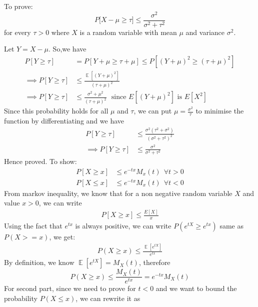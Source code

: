 \begin{solution}
	To prove:
	\begin{equation}
		P\big[X- \mu \geq \tau \big] \leq \frac{\sigma^2}{\sigma^2+\tau^2}
	\end{equation}
	for every $\tau >0$ where $X$ is a random variable with mean $\mu$ and variance $\sigma^2$. \\
	\par Let $Y=X-\mu$. So,we have
	\begin{align}
		P[Y\geq \tau]          & =P[Y+\mu \geq \tau+\mu] \leq P[(Y+\mu)^2\geq (\tau+\mu)^2]                              \\
		\implies P[Y\geq \tau] & \leq \frac{\mathop{\mathbb{E}}[(Y+\mu)^2]}{(\tau+\mu)^2}                                \\
		\implies P[Y\geq \tau] & \leq \frac{\sigma^2+\mu^2}{(\tau+\mu)^2} \:\:\: \text{since $E[(Y+\mu)^2]$ is $E[X^2]$}
	\end{align}
	Since this probability holds for all $\mu$ and $\tau$, we can put $\mu=\frac{\sigma^2}{\tau}$ to minimise the function by differentiating and we have
	\begin{align}
		P[Y\geq \tau]          & \leq \frac{\sigma^{2}(\tau^2+\sigma^2)}{(\sigma^2+\tau^2)^2} \\
		\implies P[Y\geq \tau] & \leq \frac{\sigma^{2}}{\sigma^2+\tau^2}
	\end{align}
	Hence proved.
	To show:
	\begin{align}
		P[X\geq x] & \leq e^{-tx}M_{x}(t) \:\:\forall t>0 \\
		P[X\leq x] & \leq e^{-tx}M_{x}(t) \:\:\forall t<0
	\end{align}
	From markov inequality, we know that for a non negative random variable $X$ and value $x>0$, we can write
	\begin{align}
		P[X\geq x]\leq \frac{E[X]}{x}
	\end{align}
	Using the fact that $e^{tx}$ is always positive, we can write $P(e^{tX}\geq e^{tx})$ same as $P(X>=x)$, we get:
	\begin{align}
		P(X\geq x)\leq \frac{\mathop{\mathbb{E}}[e^{tX}]}{e^{tx}}
	\end{align}
	By definition, we know $\mathop{\mathbb{E}}[e^{tX}]=M_{X}(t)$, therefore
	\begin{equation}
		P(X\geq x)\leq \frac{M_{X}(t)}{e^{tx}}=e^{-tx}M_{X}(t)
	\end{equation}
	For second part, since we need to prove for $t<0$ and we want to bound the probability $P(X\leq x)$, we can rewrite it as

\end{solution}
